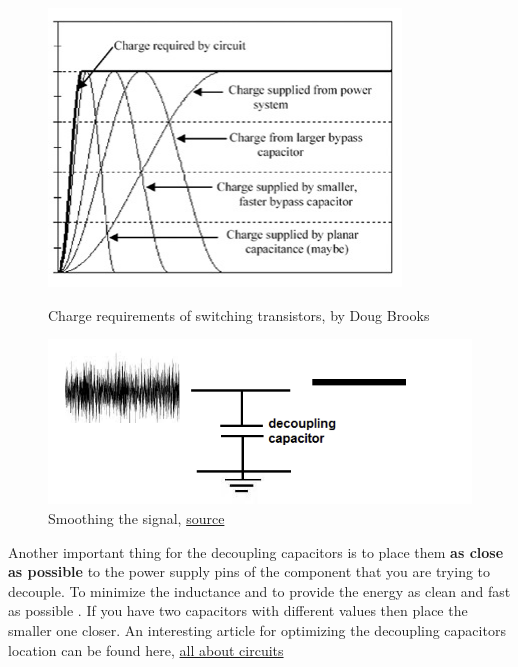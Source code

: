 \documentclass[final]{cubedoc}
\begin{document}
	\begin{figure}[h!]
		\centering
		\begin{minipage}[b]{0.4\textwidth}
			\includegraphics[keepaspectratio, width = \textwidth, height=.3\textheight]{assets/bypass_charge.png}
			\caption{Charge requirements of switching transistors, by Doug Brooks}	
		\end{minipage}
		\hfill
		\begin{minipage}[b]{0.4\textwidth}
			\includegraphics[keepaspectratio, width = \textwidth]{assets/decoupling.png}
			\caption{Smoothing the signal, \href{http://www.learningaboutelectronics.com/Articles/Decoupling-capacitor.php}{source}}
		\end{minipage}
	\end{figure}
	
	Another important thing for the decoupling capacitors is to place them \textbf{as close as possible} to the power supply pins of the component that you are trying to decouple. To minimize the inductance and to provide the energy as clean and fast as possible 
	. If you have two capacitors with different values then place the smaller one closer. An interesting article for optimizing the decoupling capacitors location can be found here, \href{https://www.allaboutcircuits.com/technical-articles/pcb-layout-tips-and-tricks-how-to-optimize-your-decoupling-connection/}{all about circuits}
	
\end{document}
